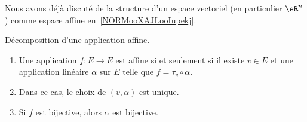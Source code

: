 Nous avons déjà discuté de la structure d'un espace vectoriel (en particulier \( \eR^n\)) comme espace affine en~\ref{NORMooXAJLooIupekj}.


\begin{lemma}\label{LEMooZZAIooOMiayy}
    Décomposition d'une application affine.
    \begin{enumerate}
        \item       \label{ITEMooSJBFooYHURto}
            Une application \( f\colon E\to E\) est affine si et seulement si il existe \( v\in E\) et une application linéaire \( \alpha\) sur \( E\) telle que \( f=\tau_v\circ\alpha\).
        \item       \label{ITEMooPYEOooKIesYm}
            Dans ce cas, le choix de \( (v,\alpha)\) est unique.
        \item       \label{ITEMooHIAUooRxfTqx}
            Si \( f\) est bijective, alors \( \alpha\) est bijective.
    \end{enumerate}
\end{lemma}

